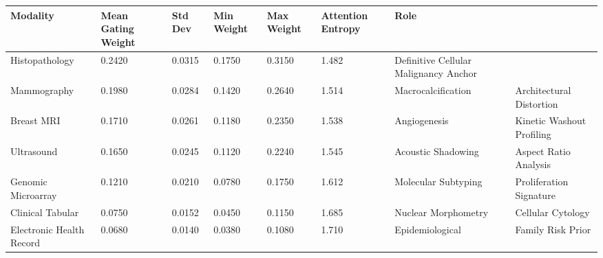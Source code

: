 \begin{tabular}{lllllll}
\toprule
Modality & Mean Gating Weight & Std Dev & Min Weight & Max Weight & Attention Entropy & Role \\
\midrule
Histopathology & 0.2420 & 0.0315 & 0.1750 & 0.3150 & 1.482 & Definitive Cellular Malignancy Anchor \\
Mammography & 0.1980 & 0.0284 & 0.1420 & 0.2640 & 1.514 & Macrocalcification & Architectural Distortion \\
Breast MRI & 0.1710 & 0.0261 & 0.1180 & 0.2350 & 1.538 & Angiogenesis & Kinetic Washout Profiling \\
Ultrasound & 0.1650 & 0.0245 & 0.1120 & 0.2240 & 1.545 & Acoustic Shadowing & Aspect Ratio Analysis \\
Genomic Microarray & 0.1210 & 0.0210 & 0.0780 & 0.1750 & 1.612 & Molecular Subtyping & Proliferation Signature \\
Clinical Tabular & 0.0750 & 0.0152 & 0.0450 & 0.1150 & 1.685 & Nuclear Morphometry & Cellular Cytology \\
Electronic Health Record & 0.0680 & 0.0140 & 0.0380 & 0.1080 & 1.710 & Epidemiological & Family Risk Prior \\
\bottomrule
\end{tabular}
